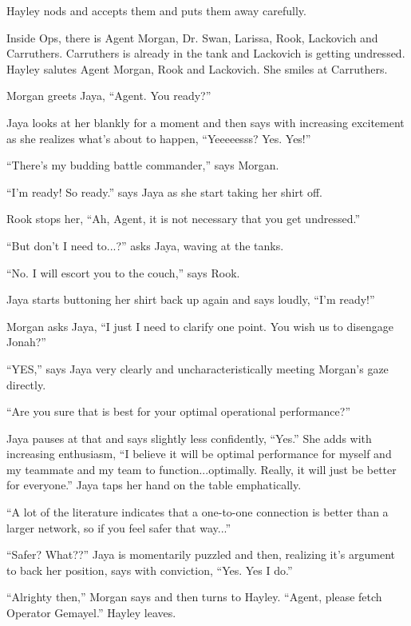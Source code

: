 Hayley nods and accepts them and puts them away carefully.



Inside Ops, there is Agent Morgan, Dr. Swan, Larissa, Rook, Lackovich and Carruthers.  Carruthers is already in the tank and Lackovich is getting undressed.   Hayley salutes Agent Morgan, Rook and Lackovich.  She smiles at Carruthers.

Morgan greets Jaya, ``Agent.  You ready?''

Jaya looks at her blankly for a moment and then says with increasing excitement as she realizes what's about to happen, ``Yeeeeesss?  Yes.  Yes!''

``There's my budding battle commander,'' says Morgan.

``I'm ready!  So ready.'' says Jaya as she start taking her shirt off.

Rook stops her, ``Ah, Agent, it is not necessary that you get undressed.''

``But don't I need to...?'' asks Jaya, waving at the tanks.

``No.  I will escort you to the couch,'' says Rook. 

Jaya starts buttoning her shirt back up again and says loudly, ``I'm ready!''

Morgan asks Jaya, ``I just I need to clarify one point.  You wish us to disengage Jonah?''

``YES,'' says Jaya very clearly and uncharacteristically meeting Morgan's gaze directly.

``Are you sure that is best for your optimal operational performance?''

Jaya pauses at that and says slightly less confidently, ``Yes.''  She adds with increasing enthusiasm, ``I believe it will be optimal performance for myself and my teammate and my team to function...optimally.  Really, it will just be better for everyone.'' Jaya taps her hand on the table emphatically.

``A lot of the literature indicates that a one-to-one connection is better than a larger network, so if you feel safer that way...''

``Safer?  What??'' Jaya is momentarily puzzled and then, realizing it's argument to back her position, says with conviction, ``Yes.  Yes I do.''

``Alrighty then,'' Morgan says and then turns to Hayley.  ``Agent, please fetch Operator Gemayel.''  Hayley leaves.



